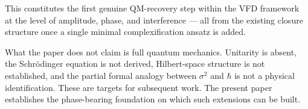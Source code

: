 \documentclass[12pt]{article}
\begin{document}
This constitutes the first genuine QM-recovery step within the VFD framework at the level of amplitude, phase, and interference --- all from the existing closure structure once a single minimal complexification ansatz is added.

What the paper does not claim is full quantum mechanics. Unitarity is absent, the Schr\"odinger equation is not derived, Hilbert-space structure is not established, and the partial formal analogy between $\sigma^2$ and $\hbar$ is not a physical identification. These are targets for subsequent work. The present paper establishes the phase-bearing foundation on which such extensions can be built.



\end{document}
